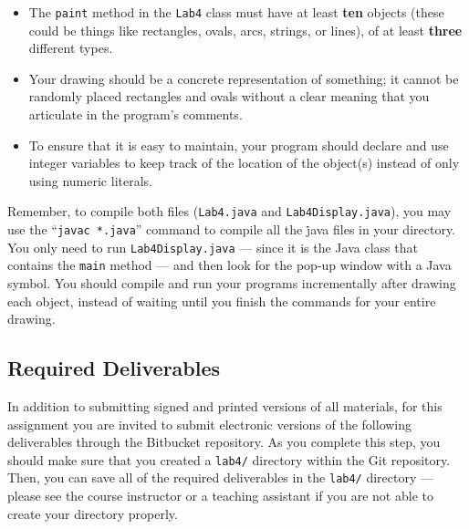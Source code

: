 \begin{itemize}

  \item The {\tt paint} method in the {\tt Lab4} class must have at least \textbf{ten} objects (these could be things
    like rectangles, ovals, arcs, strings, or lines), of at least \textbf{three} different types.

  \item Your drawing should be a concrete representation of something; it cannot be randomly placed rectangles and
    ovals without a clear meaning that you articulate in the program's comments.

  \item To ensure that it is easy to maintain, your program should declare and use integer variables to keep track of
    the location of the object(s) instead of only using numeric literals.

\end{itemize}

\begin{sloppypar}
Remember, to compile both files ({\tt Lab4.java} and {\tt Lab4Display.java}), you may use the ``{\tt javac *.java}''
command to compile all the {\.java} files in your directory. You only need to run {\tt Lab4Display.java} --- since it is
the Java class that contains the {\tt main} method --- and then look for the pop-up window with a Java symbol. You should
compile and run your programs incrementally after drawing each object, instead of waiting until you finish the commands
for your entire drawing.
\end{sloppypar}

\vspace*{-.1in}
\subsection*{Required Deliverables}

In addition to submitting signed and printed versions of all materials, for this assignment you are invited to submit
electronic versions of the following deliverables through the Bitbucket repository. As you complete this step, you
should make sure that you created a {\tt lab4/} directory within the Git repository.  Then, you can save all of the
required deliverables in the {\tt lab4/} directory --- please see the course instructor or a teaching assistant if you are
not able to create your directory properly.

